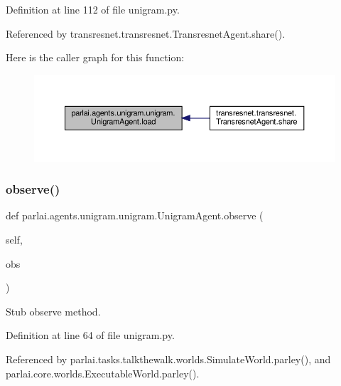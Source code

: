 Definition at line 112 of file unigram.\+py.



Referenced by transresnet.\+transresnet.\+Transresnet\+Agent.\+share().

Here is the caller graph for this function\+:
\nopagebreak
\begin{figure}[H]
\begin{center}
\leavevmode
\includegraphics[width=350pt]{classparlai_1_1agents_1_1unigram_1_1unigram_1_1UnigramAgent_a01fa26682df757201166d6f18be60da8_icgraph}
\end{center}
\end{figure}
\mbox{\label{classparlai_1_1agents_1_1unigram_1_1unigram_1_1UnigramAgent_a2c0cb628c4cc600b0968e6161d7a139a}} 
\subsubsection{\texorpdfstring{observe()}{observe()}}
{\footnotesize\ttfamily def parlai.\+agents.\+unigram.\+unigram.\+Unigram\+Agent.\+observe (\begin{DoxyParamCaption}\item[{}]{self,  }\item[{}]{obs }\end{DoxyParamCaption})}

\begin{DoxyVerb}Stub observe method.\end{DoxyVerb}
 

Definition at line 64 of file unigram.\+py.



Referenced by parlai.\+tasks.\+talkthewalk.\+worlds.\+Simulate\+World.\+parley(), and parlai.\+core.\+worlds.\+Executable\+World.\+parley().

